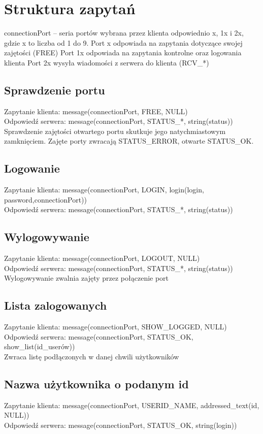 \documentclass[a4paper]{article}
\begin{document}
\section{Struktura zapytań}
connectionPort -- seria portów wybrana przez klienta
odpowiednio x, 1x i 2x, gdzie x to liczba od 1 do 9.
Port x odpowiada na zapytania dotyczące swojej zajętości (FREE)
Port 1x odpowiada na zapytania kontrolne oraz logowania klienta
Port 2x wysyła wiadomości z serwera do klienta (RCV\_*)

\subsection{Sprawdzenie portu}
Zapytanie klienta: message(connectionPort, FREE, NULL) \\
Odpowiedź serwera: message(connectionPort, STATUS\_*, string(status))\\
Sprawdzenie zajętości otwartego portu skutkuje jego natychmiastowym zamknięciem.
Zajęte porty zwracają STATUS\_ERROR, otwarte STATUS\_OK.
\subsection{Logowanie}
Zapytanie klienta: message(connectionPort, LOGIN, login(login, password,connectionPort))\\
Odpowiedź serwera: message(connectionPort, STATUS\_*, string(status))
\subsection{Wylogowywanie}
Zapytanie klienta: message(connectionPort, LOGOUT, NULL) \\
Odpowiedź serwera: message(connectionPort, STATUS\_*, string(status)) \\
Wylogowywanie zwalnia zajęty przez połączenie port
\subsection{Lista zalogowanych}
Zapytanie klienta: message(connectionPort, SHOW\_LOGGED, NULL) \\
Odpowiedź serwera: message(connectionPort, STATUS\_OK, show\_list(id\_userów)) \\
Zwraca listę podłączonych w danej chwili użytkowników
\subsection{Nazwa użytkownika o podanym id}
Zapytanie klienta: message(connectionPort, USERID\_NAME, addressed\_text(id, NULL))\\
Odpowiedź serwera: message(connectionPort, STATUS\_OK, string(login))
\end{document}
